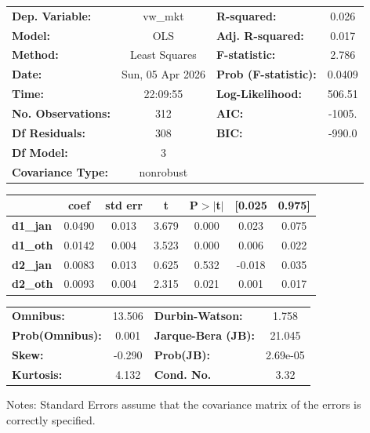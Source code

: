 \begin{center}
\begin{tabular}{lclc}
\toprule
\textbf{Dep. Variable:}    &     vw\_mkt      & \textbf{  R-squared:         } &     0.026   \\
\textbf{Model:}            &       OLS        & \textbf{  Adj. R-squared:    } &     0.017   \\
\textbf{Method:}           &  Least Squares   & \textbf{  F-statistic:       } &     2.786   \\
\textbf{Date:}             & Sun, 05 Apr 2026 & \textbf{  Prob (F-statistic):} &   0.0409    \\
\textbf{Time:}             &     22:09:55     & \textbf{  Log-Likelihood:    } &    506.51   \\
\textbf{No. Observations:} &         312      & \textbf{  AIC:               } &    -1005.   \\
\textbf{Df Residuals:}     &         308      & \textbf{  BIC:               } &    -990.0   \\
\textbf{Df Model:}         &           3      & \textbf{                     } &             \\
\textbf{Covariance Type:}  &    nonrobust     & \textbf{                     } &             \\
\bottomrule
\end{tabular}
\begin{tabular}{lcccccc}
                 & \textbf{coef} & \textbf{std err} & \textbf{t} & \textbf{P$> |$t$|$} & \textbf{[0.025} & \textbf{0.975]}  \\
\midrule
\textbf{d1\_jan} &       0.0490  &        0.013     &     3.679  &         0.000        &        0.023    &        0.075     \\
\textbf{d1\_oth} &       0.0142  &        0.004     &     3.523  &         0.000        &        0.006    &        0.022     \\
\textbf{d2\_jan} &       0.0083  &        0.013     &     0.625  &         0.532        &       -0.018    &        0.035     \\
\textbf{d2\_oth} &       0.0093  &        0.004     &     2.315  &         0.021        &        0.001    &        0.017     \\
\bottomrule
\end{tabular}
\begin{tabular}{lclc}
\textbf{Omnibus:}       & 13.506 & \textbf{  Durbin-Watson:     } &    1.758  \\
\textbf{Prob(Omnibus):} &  0.001 & \textbf{  Jarque-Bera (JB):  } &   21.045  \\
\textbf{Skew:}          & -0.290 & \textbf{  Prob(JB):          } & 2.69e-05  \\
\textbf{Kurtosis:}      &  4.132 & \textbf{  Cond. No.          } &     3.32  \\
\bottomrule
\end{tabular}
\end{center}

Notes: \newline
 [1] Standard Errors assume that the covariance matrix of the errors is correctly specified.